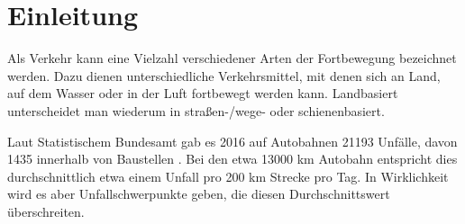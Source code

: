 \section{Einleitung}
\label{sec:einleitung}


Als Verkehr kann eine Vielzahl verschiedener Arten der Fortbewegung bezeichnet werden. 
Dazu dienen unterschiedliche Verkehrsmittel, mit denen sich an Land, auf dem Wasser oder in der Luft fortbewegt werden kann.
Landbasiert unterscheidet man wiederum in straßen-/wege- oder schienenbasiert.



Laut Statistischem Bundesamt gab es 2016 auf Autobahnen 21193 Unfälle, davon 1435 innerhalb von Baustellen \cite{unf2016}. 
Bei den etwa 13000 km Autobahn \cite{autob2016} entspricht dies durchschnittlich etwa einem Unfall pro 200 km Strecke pro Tag. 
In Wirklichkeit wird es aber Unfallschwerpunkte geben, die diesen Durchschnittswert überschreiten.



 
%
%
%
